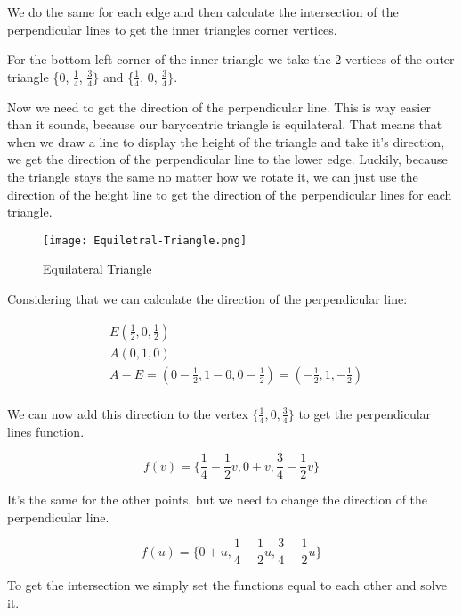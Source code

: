 \documentclass[12pt]{report} \usepackage{preamble}
\begin{document}
We do the same for each edge and then calculate the intersection of the perpendicular lines to get the inner triangles
corner vertices.

For the bottom left corner of the inner triangle we take the 2 vertices of the outer triangle \{0, \(\frac{1}{4}\), \(\frac{3}{4}\}\)
and \{\(\frac{1}{4}\), 0, \(\frac{3}{4}\}\).

Now we need to get the direction of the perpendicular line. This is way easier than it sounds, because our barycentric triangle is
equilateral. That means that when we draw a line to display the height of the triangle and take it's direction, we get the direction
of the perpendicular line to the lower edge. Luckily, because the triangle stays the same no matter how we rotate it, we can just use
the direction of the height line to get the direction of the perpendicular lines for each triangle. \cite{equilateral-triangle}

\begin{figure}[htbp]
	\centering \texttt{[image: Equiletral-Triangle.png]}
	\caption{Equilateral Triangle}
	\cite{equilateral-triangle}
\end{figure} \FloatBarrier

Considering that we can calculate the direction of the perpendicular line:

\[
	\begin{aligned}
		 & E(\frac{1}{2}, 0, \frac{1}{2})                                                      \\
		 & A(0, 1, 0)                                                                          \\
		 & A - E = (0 - \frac{1}{2}, 1 - 0, 0 - \frac{1}{2}) = (-\frac{1}{2}, 1, -\frac{1}{2}) \\
	\end{aligned}
\]

We can now add this direction to the vertex \(\{\frac{1}{4}, 0, \frac{3}{4}\}\) to get the perpendicular lines function.

\[
	f(v) = \{\frac{1}{4} - \frac{1}{2}v, 0 + v, \frac{3}{4} - \frac{1}{2}v\}
\]

It's the same for the other points, but we need to change the direction of the perpendicular line.

\[
	f(u) = \{0+u, \frac{1}{4} - \frac{1}{2}u, \frac{3}{4} - \frac{1}{2}u\}
\]

To get the intersection we simply set the functions equal to each other and solve it.
\end{document}
